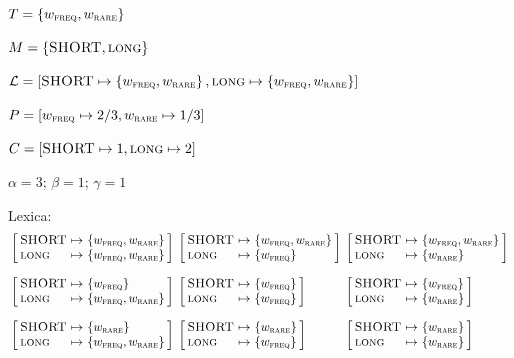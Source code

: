 \documentclass{article}
\begin{document}
\newcommand{\mannerstate}[1]{w_{\textsc{#1}}}
\newcommand{\wFREQ}{\mannerstate{freq}}
\newcommand{\wRARE}{\mannerstate{rare}}


\newcommand{\mannerlex}[2]{
  \left[
    \begin{array}[c]{l@{ \ \mapsto \ } l}
      \mSHORT & \set{#1} \\
      \mLONG & \set{#2}
    \end{array}
  \right]}

\begin{examples}
\item $\States = \set{\wFREQ,\wRARE}$ 
\item $M = \left\{ \textsc{SHORT}, \textsc{long} \right\}$
\item $\Lex = [\mSHORT \mapsto \set{\wFREQ,\wRARE}, \mLONG \mapsto \set{\wFREQ,\wRARE}]$
\item $\Prior = [\wFREQ \mapsto 2/3, \wRARE \mapsto 1/3]$
\item $C = [\textsc{SHORT} \mapsto 1, \textsc{long} \mapsto 2]$
\item $\alpha = 3$; $\beta = 1$; $\gamma = 1$  
\item Lexica:
  \[
  \setlength{\arraycolsep}{2pt} 
  \begin{array}[c]{l l l}
  \mannerlex{\wFREQ,\wRARE}{\wFREQ,\wRARE}
  &
  \mannerlex{\wFREQ,\wRARE}{\wFREQ}
  &
  \mannerlex{\wFREQ,\wRARE}{\wRARE}
  \\[4ex]
  \mannerlex{\wFREQ}{\wFREQ,\wRARE}
  &
  \mannerlex{\wFREQ}{\wFREQ}
  &
  \mannerlex{\wFREQ}{\wRARE}
  \\[4ex]
  \mannerlex{\wRARE}{\wFREQ,\wRARE}
  &
  \mannerlex{\wRARE}{\wFREQ}
  &
  \mannerlex{\wRARE}{\wRARE}
  \end{array}
  \]
\end{examples}
\end{document}
